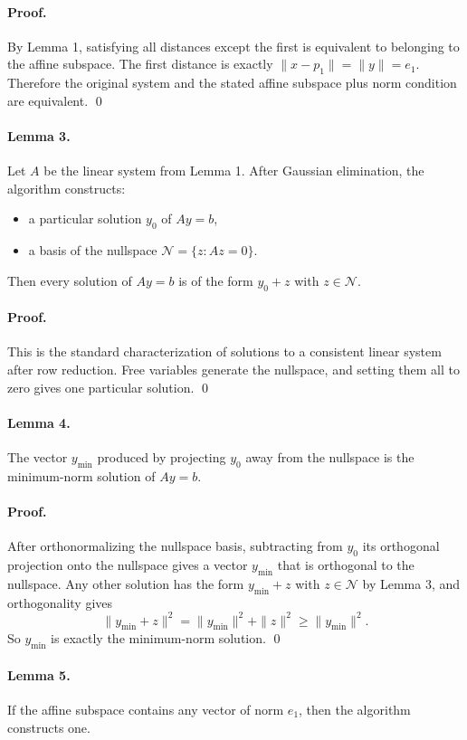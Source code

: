 \documentclass[11pt]{article}
\begin{document}
\paragraph{Proof.}
By Lemma 1, satisfying all distances except the first is equivalent to belonging to the affine subspace.
The first distance is exactly $\|x-p_1\|=\|y\|=e_1$. Therefore the original system and the stated affine
subspace plus norm condition are equivalent. \qed

\paragraph{Lemma 3.}
Let $A$ be the linear system from Lemma 1. After Gaussian elimination, the algorithm constructs:
\begin{itemize}[leftmargin=*]
    \item a particular solution $y_0$ of $Ay=b$,
    \item a basis of the nullspace $\mathcal{N}=\{z:Az=0\}$.
\end{itemize}
Then every solution of $Ay=b$ is of the form $y_0+z$ with $z \in \mathcal{N}$.

\paragraph{Proof.}
This is the standard characterization of solutions to a consistent linear system after row reduction. Free
variables generate the nullspace, and setting them all to zero gives one particular solution. \qed

\paragraph{Lemma 4.}
The vector $y_{\min}$ produced by projecting $y_0$ away from the nullspace is the minimum-norm solution
of $Ay=b$.

\paragraph{Proof.}
After orthonormalizing the nullspace basis, subtracting from $y_0$ its orthogonal projection onto the
nullspace gives a vector $y_{\min}$ that is orthogonal to the nullspace.
Any other solution has the form $y_{\min}+z$ with $z \in \mathcal{N}$ by Lemma 3, and orthogonality gives
\[
    \|y_{\min}+z\|^2 = \|y_{\min}\|^2 + \|z\|^2 \ge \|y_{\min}\|^2.
\]
So $y_{\min}$ is exactly the minimum-norm solution. \qed

\paragraph{Lemma 5.}
If the affine subspace contains any vector of norm $e_1$, then the algorithm constructs one.
\end{document}
